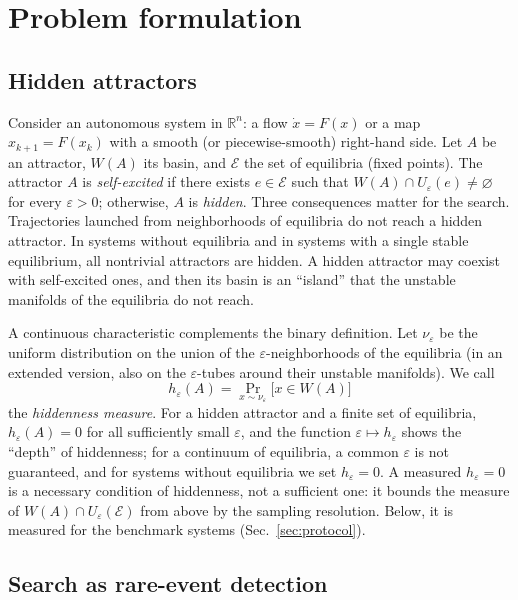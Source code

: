\section{Problem formulation}\label{sec:problem}

\subsection{Hidden attractors}\label{sec:hidden}

Consider an autonomous system in $\mathbb{R}^n$: a flow $\dot x=F(x)$ or a map $x_{k+1}=F(x_k)$ with a smooth (or piecewise-smooth) right-hand side. Let $A$ be an attractor, $W(A)$ its basin, and $\mathcal{E}$ the set of equilibria (fixed points). The attractor $A$ is \emph{self-excited} if there exists $e\in\mathcal{E}$ such that $W(A)\cap U_\varepsilon(e)\neq\varnothing$ for every $\varepsilon>0$; otherwise, $A$ is \emph{hidden}.\cite{LeonovKuznetsov2013} Three consequences matter for the search. Trajectories launched from neighborhoods of equilibria do not reach a hidden attractor. In systems without equilibria and in systems with a single stable equilibrium, all nontrivial attractors are hidden. A hidden attractor may coexist with self-excited ones, and then its basin is an ``island'' that the unstable manifolds of the equilibria do not reach.

A continuous characteristic complements the binary definition. Let $\nu_\varepsilon$ be the uniform distribution on the union of the $\varepsilon$-neighborhoods of the equilibria (in an extended version, also on the $\varepsilon$-tubes around their unstable manifolds). We call
\begin{equation}
h_\varepsilon(A)=\Pr_{x\sim\nu_\varepsilon}\bigl[x\in W(A)\bigr]
\label{eq:heps}
\end{equation}
the \emph{hiddenness measure}. For a hidden attractor and a finite set of equilibria, $h_\varepsilon(A)=0$ for all sufficiently small $\varepsilon$, and the function $\varepsilon\mapsto h_\varepsilon$ shows the ``depth'' of hiddenness; for a continuum of equilibria, a common $\varepsilon$ is not guaranteed, and for systems without equilibria we set $h_\varepsilon=0$. A measured $h_\varepsilon=0$ is a necessary condition of hiddenness, not a sufficient one: it bounds the measure of $W(A)\cap U_\varepsilon(\mathcal E)$ from above by the sampling resolution. Below, it is measured for the benchmark systems (Sec.~\ref{sec:protocol}).

\subsection{Search as rare-event detection}\label{sec:rare}

